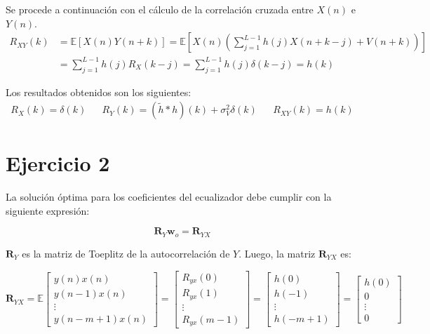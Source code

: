 Se procede a continuación con el cálculo de la correlación cruzada entre $X(n)$ e $Y(n)$.
\begin{align*}
    R_{XY}(k) &= \mathbb{E}[X(n)Y(n+k)] = \mathbb{E}\left[X(n)\left(\sum_{j=1}^{L-1} h(j)X(n + k - j) + V(n+k)\right)\right]\\
    &= \sum_{j=1}^{L-1} h(j) R_X(k-j) = \sum_{j=1}^{L-1} h(j) \delta(k-j) = h(k)
\end{align*}

Los resultados obtenidos son los siguientes:
\begin{align*}
    \boxed{R_X(k) = \delta(k)} &&
    \boxed{R_Y(k) = (\tilde{h} * h)(k) + \sigma_V^2 \delta(k)} &&
    \boxed{R_{XY}(k) = h(k)}
\end{align*}

\section{Ejercicio 2}
La solución óptima para los coeficientes del ecualizador debe cumplir con la siguiente expresión:

\begin{equation}
	\textbf{R}_Y \textbf{w}_o = \textbf{R}_{YX}
\end{equation}

$\textbf{R}_Y$ es la matriz de Toeplitz de la autocorrelación de $Y$. Luego, la matriz $\textbf{R}_{YX}$ es: 

\[
\mathbf{R}_{YX} = \mathbb{E}
\begin{bmatrix}
	y(n) x(n) \\
	y(n-1) x(n) \\
	\vdots \\
	y(n - m + 1) x(n)
\end{bmatrix}
=
\begin{bmatrix}
	R_{yx}(0) \\
	R_{yx}(1) \\
	\vdots \\
	R_{yx}(m-1)
\end{bmatrix}
=
\begin{bmatrix}
	h(0) \\
	h(-1) \\
	\vdots \\
	h(-m+1)
\end{bmatrix}
=
\begin{bmatrix}
	h(0) \\
	0 \\
	\vdots \\
	0
\end{bmatrix}
\]


